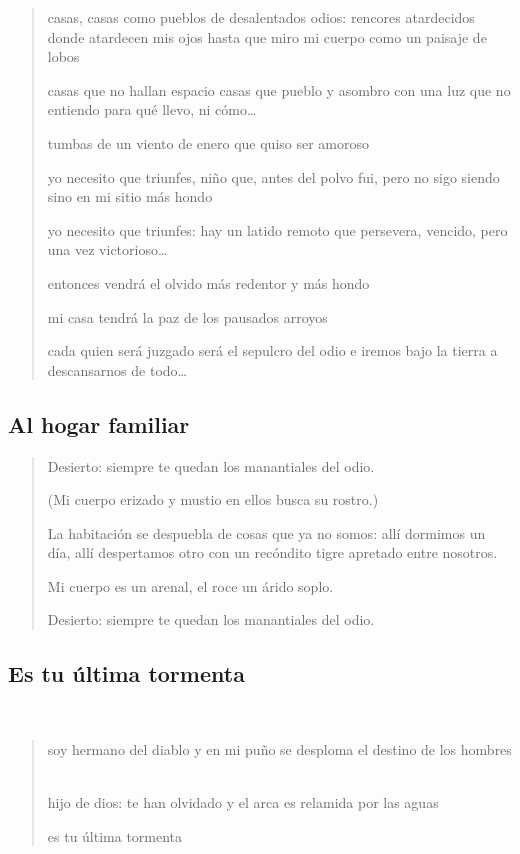 \documentclass[a4paper, 12pt]{article}
\begin{document}
\begin{verse}

casas, casas como pueblos 
de desalentados odios:
rencores atardecidos
donde atardecen mis ojos
hasta que miro mi cuerpo
como un paisaje de lobos
~

casas que no hallan espacio
casas que pueblo y asombro 
con una luz que no entiendo 
para qué llevo, ni cómo\ldots
~

tumbas de un viento de enero 
que quiso ser amoroso
~

yo necesito que triunfes,
niño que, antes del polvo 
fui, pero no sigo siendo 
sino en mi sitio más hondo 
~

yo necesito que triunfes:
hay un latido remoto 
que persevera, vencido, 
pero una vez victorioso\ldots
~

entonces vendrá el olvido 
más redentor y más hondo 
~ 

mi casa tendrá la paz 
de los pausados arroyos
~

cada quien será juzgado
será el sepulcro del odio
e iremos bajo la tierra
a descansarnos de todo\ldots




\end{verse}


\pagebreak
\subsection{Al hogar familiar}

\begin{verse}
   

Desierto: siempre te quedan 
los manantiales del odio. 
~ 

(Mi cuerpo erizado y mustio
en ellos busca su rostro.) 
~

La habitación se despuebla
de cosas que ya no somos:
allí dormimos un día,
allí despertamos otro 
con un recóndito tigre
apretado entre nosotros.
~ 

Mi cuerpo es un arenal,
el roce un árido soplo.
~ 

Desierto: siempre te quedan 
los manantiales del odio.


\end{verse}

\pagebreak
\subsection{Es tu última tormenta}
~ 

\begin{verse}
    
soy hermano del diablo y en mi puño
se desploma el destino de los hombres
~

hijo de dios: te han olvidado
y el arca es relamida por las aguas
~

es tu última tormenta
\end{verse}
\end{document}
